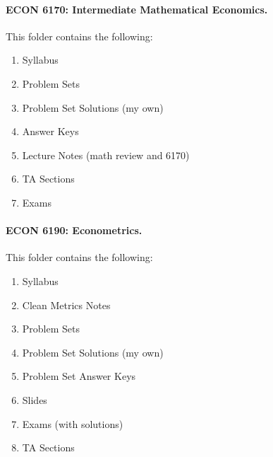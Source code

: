 \documentclass[12pt]{article}
\begin{document}
	
	\paragraph{ECON 6170: Intermediate Mathematical Economics.} This folder contains the following:
	\begin{enumerate}
		\item Syllabus
		\item Problem Sets
		\item Problem Set Solutions (my own)
		\item Answer Keys
		\item Lecture Notes (math review and 6170)
		\item TA Sections
		\item Exams
	\end{enumerate}
	
	
	\paragraph{ECON 6190: Econometrics.} This folder contains the following:
	\begin{enumerate}
		\item Syllabus
		\item Clean Metrics Notes
		\item Problem Sets
		\item Problem Set Solutions (my own)
		\item Problem Set Answer Keys
		\item Slides
		\item Exams (with solutions)
		\item TA Sections
	\end{enumerate}
	
	
	
	
	
	
	
	
	
	
	
	
	
	
	
	
	
	
	
	
\end{document}
